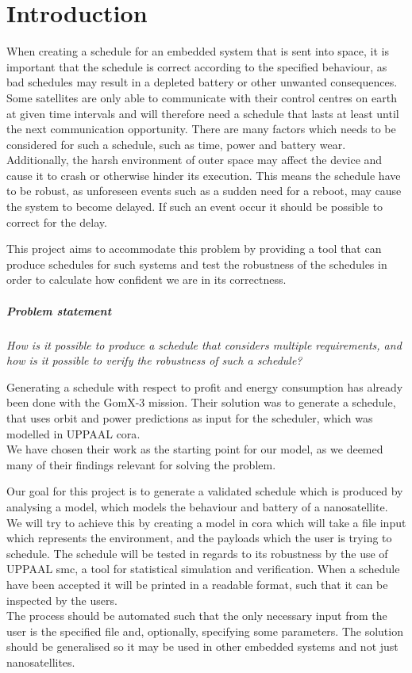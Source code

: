 \chapter{Introduction}\label{cha:intro}
When creating a schedule for an embedded system that is sent into space, it is important that the schedule is correct according to the specified behaviour, as bad schedules may result in a depleted battery or other unwanted consequences. 
Some satellites are only able to communicate with their control centres on earth at given time intervals and will therefore need a schedule that lasts at least until the next communication opportunity.
There are many factors which needs to be considered for such a schedule, such as time, power and battery wear. 
Additionally, the harsh environment of outer space may affect the device and cause it to crash or otherwise hinder its execution.
This means the schedule have to be robust, as unforeseen events such as a sudden need for a reboot, may cause the system to become delayed. If such an event occur it should be possible to correct for the delay.

This project aims to accommodate this problem by providing a tool that can produce schedules for such systems and test the robustness of the schedules in order to calculate how confident we are in its correctness.

\paragraph{Problem statement}
\textit{How is it possible to produce a schedule that considers multiple requirements, and how is it possible to verify the robustness of such a schedule?}

Generating a schedule with respect to profit and energy consumption has already been done with the GomX-3 mission\cite{gomx3}. 
Their solution was to generate a schedule, that uses orbit and power predictions as input for the scheduler, which was modelled in UPPAAL \gls{cora}.\\
We have chosen their work as the starting point for our model, as we deemed many of their findings relevant for solving the problem.

Our goal for this project is to generate a validated schedule which is produced by analysing a model, which models the behaviour and battery of a nanosatellite. \\
We will try to achieve this by creating a model in \gls{cora} which will take a file input which represents the environment, and the payloads which the user is trying to schedule.
The schedule will be tested in regards to its robustness by the use of UPPAAL \gls{smc}, a tool for statistical simulation and verification. 
When a schedule have been accepted it will be printed in a readable format, such that it can be inspected by the users. \\
The process should be automated such that the only necessary input from the user is the specified file and, optionally, specifying some parameters. 
The solution should be generalised so it may be used in other embedded systems and not just nanosatellites.


